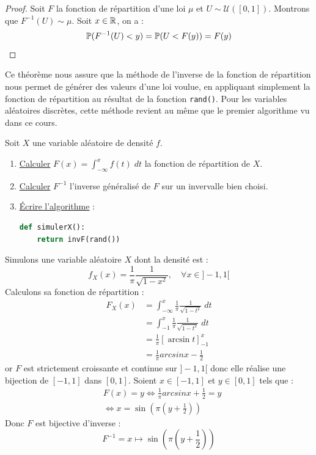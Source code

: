 \begin{proof}
    Soit $F$ la fonction de répartition d'une loi $ \mu$ et $ U \sim \mathcal{U}([0,1])$. 
    Montrons que $F^{-1}(U) \sim \mu$. Soit $x \in \mathbb{R}$, on a : 
        $$ \mathbb{P}(F^{-1}(U) < y) = \mathbb{P}(U < F(y)) = F(y) $$  
\end{proof}

Ce théorème nous assure que la méthode de l'inverse de la fonction de répartition nous permet de 
générer des valeurs d'une loi voulue, en appliquant simplement la fonction de répartition au 
résultat de la fonction \texttt{rand()}.
Pour les variables aléatoires discrètes, cette méthode revient au même que le premier algorithme vu dans 
ce cours. 

\begin{proposition}
    Soit $X$ une variable aléatoire de densité $f$. 
    \begin{enumerate}
        \item \underline{Calculer} $F(x) = \int_{- \infty}^x f(t) \; dt$ la fonction de répartition de $X$. 
        \item \underline{Calculer} $F^{-1}$ l'inverse généralisé de $F$ sur un invervalle bien choisi. 
        \item \underline{Écrire l'algorithme} : 
            \begin{lstlisting}[language=Python]
def simulerX(): 
    return invF(rand())
            \end{lstlisting}
    \end{enumerate}
\end{proposition}

\begin{example}
    Simulons une variable aléatoire $X$ dont la densité est : 
        $$ f_X(x) = \frac{1}{\pi} \frac{1}{\sqrt{1 - x^2}}, \quad \forall x \in ]-1, 1[ $$ 
    Calculons sa fonction de répartition : 
        \begin{align*}
            F_X(x) &= \int_{-\infty}^x \frac{1}{\pi} \frac{1}{\sqrt{1 - t^2}} \; dt \\ 
            &= \int_{-1}^{x} \frac{1}{\pi} \frac{1}{\sqrt{1 - t^2}} \; dt \\ 
            &= \frac{1}{\pi} \left[ \arcsin t \right]_{-1}^x \\ 
            &= \frac{1}{\pi} arcsin x - \frac{1}{2}   
        \end{align*}
    or $F$ est strictement croissante et continue sur $]-1, 1[$ donc elle réalise une bijection 
    de $[-1, 1]$ dans $[0,1]$. Soient $x \in [-1,1]$ et $ y \in [0,1]$ tels que : 
        \begin{align*}
            & F(x) = y \iff \frac{1}{\pi} arcsin x + \frac{1}{2}  = y \\ 
            & \iff x = \sin \left( \pi \left(y + \frac{1}{2} \right) \right)   
        \end{align*}
    Donc $F$ est bijective d'inverse : 
        $$ F^{-1} = x \longmapsto \sin \left( \pi \left(y + \frac{1}{2} \right) \right)  $$
\end{example}


